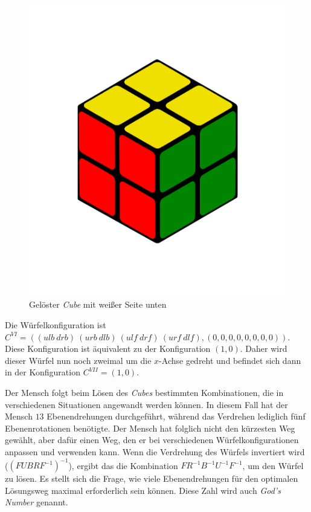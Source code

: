 \documentclass[12pt,a4paper, usenames, dvipsnames]{article}
\theoremstyle{mystyle}
\theoremstyle{definition}
\begin{document}
\begin{figure}[H]
\centering
\includegraphics[scale=0.12]{menschSchritt5.png}
\caption[Lösung von Mensch: Schritt 5]{Gelöster \textit{Cube} mit weißer Seite unten}
\label{Abbildung_LösungMensch5}
\end{figure} 

Die Würfelkonfiguration ist $ C^{VI} = (( \textit{ulb} \ \textit{drb} ) \ ( \textit{urb} \ \textit{dlb} ) \ ( \textit{ulf} \ \textit{drf} ) \ ( \textit{urf} \ \textit{dlf} ), (0,0,0,0,0,0,0,0))$. Diese Konfiguration ist äquivalent zu der Konfiguration $(1,0)$.
Daher wird dieser Würfel nun noch zweimal um die $x$-Achse gedreht und befindet sich dann in der Konfiguration $C^{VII} =(1,0)$.

Der Mensch folgt beim Lösen des \textit{Cubes} bestimmten Kombinationen, die in verschiedenen Situationen angewandt werden können.  
In diesem Fall hat der Mensch $13$ Ebenendrehungen durchgeführt, während das Verdrehen lediglich fünf Ebenenrotationen benötigte. Der Mensch hat folglich nicht den kürzesten Weg gewählt, aber dafür einen Weg, den er bei verschiedenen Würfelkonfigurationen anpassen und verwenden kann. 
Wenn die Verdrehung des Würfels invertiert wird ($(FUBRF^{-1})^{-1}$), ergibt das die Kombination $FR^{-1}B^{-1}U^{-1}F^{-1}$, um den Würfel zu lösen.
Es stellt sich die Frage, wie viele Ebenendrehungen für den optimalen Lösungsweg maximal erforderlich sein können. Diese Zahl wird auch \textit{God's Number} genannt. 
\end{document}
